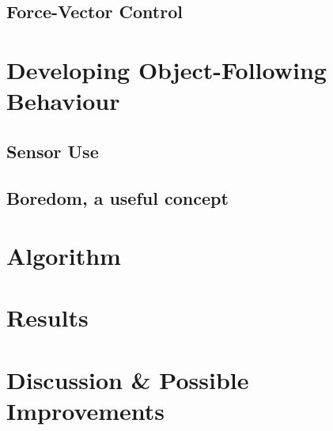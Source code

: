 \documentclass[11pt, a4paper]{article}
\begin{document}
\subsection{Force-Vector Control}





\section{Developing Object-Following Behaviour}



\subsection{Sensor Use}


\subsection{Boredom, a useful concept}


\section{Algorithm}





\newpage
\section{Results}


\section{Discussion \& Possible Improvements}


\end{document}
